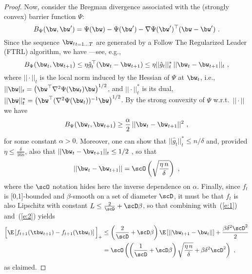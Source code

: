 \begin{proof}
Now, consider the Bregman divergence associated with the (strongly convex) barrier function $\Psi$:
\[
B_{\Psi}(\bw,\bw') = \Psi(\bw)-\Psi(\bw') -\nabla \Psi(\bw')^\top(\bw-\bw')~.
\]
Since the sequence ${\bw_t}_{t=1...T}$ are generated by a Follow The Regularized Leader (FTRL) algorithm, we have ---see, e.g., \citep[Equation~(5.2)]{hazan16}
\[
B_{\Psi}(\bw_t,\bw_{t+1}) \leq \eta{\hat g_t}^\top(\bw_t-\bw_{t+1}) \leq \eta ||{\hat g_t}||^*_t\,||\bw_t-\bw_{t+1}||_t~,
\]
where $||\cdot||_t$ is the local norm induced by the Hessian of $\Psi$ at $\bw_t$, i.e., $||\bw||_t = \big(\bw^\top \nabla^2 \Psi (\bw_t) \bw\big)^{1/2}$, and $||\cdot||^*_t$ is its dual, $||\bw||^*_t = \big(\bw^\top (\nabla^2 \Psi (\bw_t))^{-1} \bw\big)^{1/2}$. By the strong convexity of $\Psi$ w.r.t.\ $||\cdot||$ we have
\[
B_{\Psi}(\bw_t,\bw_{t+1}) \geq \frac{\alpha}{2}\,||\bw_t-\bw_{t+1}||^2~,
\]
for some constant $\alpha > 0$. Moreover, one can show that $||{\hat g_t}||^*_t \leq n/\delta$ \citep{st11} and, provided $\eta \leq \frac{\delta}{16n}$, also that $||\bw_t-\bw_{t+1}||_t \leq 1/2$ \citep{ahr12}, so that
%
\begin{equation}\label{e:2}
||\bw_t-\bw_{t+1}|| = \scO\left(\sqrt{\frac{\eta\,n}{\delta}}\right)~,
\end{equation}
%
where the $\scO$ notation hides here the inverse dependence on $\alpha$.
Finally, since $f_t$ is [0,1]-bounded and $\beta$-smooth on a set of diameter $\scD$, it must be that $f_t$ is also Lipschitz with constant $L \leq \frac{2}{\scD} + \scD\beta$, so that combining with~(\ref{e:1}) and~(\ref{e:2}) yields
%
\begin{align*}
\Bigl[\E\left[f_{t+1}(\tbw_{t+1}) - f_{t+1}(\tbw_{t})\right] \Bigl]_+
&\leq \left(\frac{2}{\scD} + \scD\beta\right)\E\left[||\bw_{t+1} -\bw_{t}||\right]  + \frac{\beta\delta^2\scD^2}{2}\\
&= \scO\left(\left(\frac{1}{\scD} + \scD\beta\right)\sqrt{\frac{\eta\,n}{\delta}}  + \beta\delta^2\scD^2\right)~,
\end{align*}
%
as claimed.
\end{proof}


